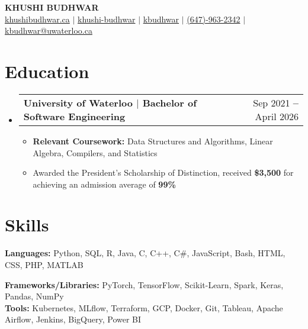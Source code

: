 \documentclass[letterpaper,11pt]{article}
\makeatletter
\newcommand{\resumeItem}[1]{
  \item\small{
    {#1 \vspace{-2pt}}
  }
}
\newcommand{\resumeSubheading}[2]{
  \vspace{-2pt}\item
    \begin{tabular*}{0.97\textwidth}[t]{l@{\extracolsep{\fill}}r}
      \textbf{#1} & {\small{#2}} \\
    \end{tabular*}\vspace{-5pt}
}
\newcommand{\resumeSubHeadingListStart}{\begin{itemize}[leftmargin=0.15in, label={}]}
\newcommand{\resumeSubHeadingListEnd}{\end{itemize}}
\newcommand{\resumeItemListStart}{\begin{itemize}}
\newcommand{\resumeItemListEnd}{\end{itemize}\vspace{-5pt}}
\makeatother
\begin{document}

\begin{center}
    {\color{customBlue}\sffamily\fontsize{30pt}{96pt}\selectfont \textbf{KHUSHI BUDHWAR}} \\ \vspace{3pt}
    \small
    \scalebox{1.1}{\faGlobe}  \href{https://khushibudhwar.ca/}{khushibudhwar.ca}
    {$|$}
    \faLinkedinSquare \hspace{.5pt} \href{https://www.linkedin.com/in/khushi-budhwar/}{khushi-budhwar}
    {$|$}
    \scalebox{1.15}{\faGithub} \href{https://github.com/kbudhwar}{kbudhwar}
    {$|$}
    \faMobile \hspace{.5pt} \href{tel:6479632342}{(647)-963-2342}
    {$|$}
    \faEnvelope \hspace{.5pt} \href{mailto:kbudhwar@uwaterloo.ca}{kbudhwar@uwaterloo.ca}
\end{center}


\section{Education}
  \vspace{3pt}
  \resumeSubHeadingListStart
    \resumeSubheading
      {\color{customBlue} {University of Waterloo} \color{black} $|$ {Bachelor of Software} Engineering
      }{Sep 2021 \textbf{--} April 2026}
    \resumeItemListStart
        \resumeItem {\textbf{Relevant Coursework: }Data Structures and Algorithms, Linear Algebra, Compilers, and Statistics}
        \resumeItem {Awarded the President's Scholarship of Distinction, received \textbf{\$3,500} for achieving an admission average of \textbf{99\%}}
    \resumeItemListEnd
  \resumeSubHeadingListEnd


\section{Skills}
  \vspace{2pt}
  \resumeSubHeadingListStart
    \small{\item{
        
        \textbf{Languages:}{ Python, SQL, R, Java, C, C++, C\#, JavaScript, Bash, HTML, CSS, PHP, MATLAB} \\ \vspace{3pt}
        
        \textbf{Frameworks/Libraries:}{ PyTorch, TensorFlow, Scikit-Learn, Spark, Keras, Pandas, NumPy} \\ \vspace{3pt}
        \textbf{Tools:}{ Kubernetes, MLflow, Terraform, GCP, Docker, Git, Tableau, Apache Airflow, Jenkins, BigQuery, Power BI} \\ \vspace{3pt}
        
    }}
  \resumeSubHeadingListEnd
\end{document}
